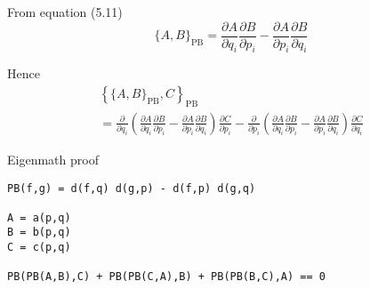 


\bigskip
From equation (5.11)
\begin{equation*}
\{A,B\}_\mathrm{PB}
=\frac{\partial A}{\partial q_i}\frac{\partial B}{\partial p_i}
-\frac{\partial A}{\partial p_i}\frac{\partial B}{\partial q_i}
\tag{5.11}
\end{equation*}

Hence
\begin{multline*}
\left\{\{A,B\}_\mathrm{PB},C\right\}_\mathrm{PB}
\\
{}=\frac{\partial}{\partial q_i}
\left(
\frac{\partial A}{\partial q_i}\frac{\partial B}{\partial p_i}
-\frac{\partial A}{\partial p_i}\frac{\partial B}{\partial q_i}
\right)
\frac{\partial C}{\partial p_i}
-\frac{\partial}{\partial p_i}
\left(
\frac{\partial A}{\partial q_i}\frac{\partial B}{\partial p_i}
-\frac{\partial A}{\partial p_i}\frac{\partial B}{\partial q_i}
\right)
\frac{\partial C}{\partial q_i}
\end{multline*}

Eigenmath proof
\begin{verbatim}
PB(f,g) = d(f,q) d(g,p) - d(f,p) d(g,q)

A = a(p,q)
B = b(p,q)
C = c(p,q)

PB(PB(A,B),C) + PB(PB(C,A),B) + PB(PB(B,C),A) == 0
\end{verbatim}


